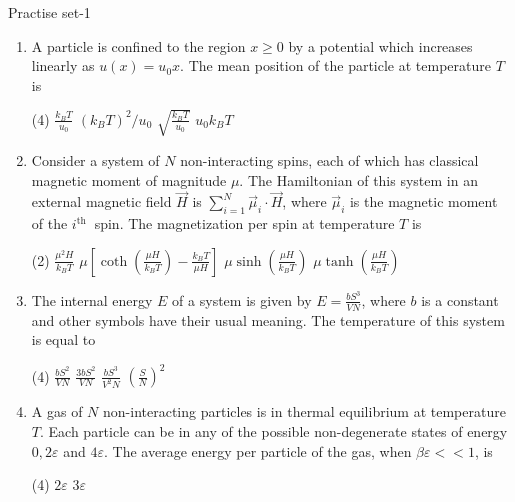 \newpage
\begin{abox}
	Practise set-1
\end{abox}
\begin{enumerate}
	\item A particle is confined to the region $x \geq 0$ by a potential which increases linearly as $u(x)=u_{0} x$. The mean position of the particle at temperature $T$ is
	{	}
	 \begin{tasks}(4)
		\task[\textbf{a.}] $\frac{k_{B} T}{u_{0}}$
		\task[\textbf{b.}]$\left(k_{B} T\right)^{2} / u_{0}$
		\task[\textbf{c.}]$\sqrt{\frac{k_{B} T}{u_{0}}}$
		\task[\textbf{d.}]  $u_{0} k_{B} T$
	\end{tasks}
\item 	Consider a system of $N$ non-interacting spins, each of which has classical magnetic moment of magnitude $\mu$. The Hamiltonian of this system in an external magnetic field $\vec{H}$ is $\sum_{i=1}^{N} \vec{\mu}_{i} \cdot \vec{H}$, where $\vec{\mu}_{i}$ is the magnetic moment of the $i^{\text {th }}$ spin. The magnetization per spin at temperature $T$ is
{	}
	 \begin{tasks}(2)
		\task[\textbf{a.}]$\frac{\mu^{2} H}{k_{B} T}$
		\task[\textbf{b.}]$\mu\left[\operatorname{coth}\left(\frac{\mu H}{k_{B} T}\right)-\frac{k_{B} T}{\mu H}\right]$
		\task[\textbf{c.}] $\mu \sinh \left(\frac{\mu H}{k_{B} T}\right)$
		\task[\textbf{d.}] $\mu \tanh \left(\frac{\mu H}{k_{B} T}\right)$
	\end{tasks}
\item 	The internal energy $E$ of a system is given by $E=\frac{b S^{3}}{V N}$, where $b$ is a constant and other symbols have their usual meaning. The temperature of this system is equal to
{	}
	 \begin{tasks}(4)
		\task[\textbf{a.}]$\frac{b S^{2}}{V N}$
		\task[\textbf{b.}]$\frac{3 b S^{2}}{V N}$
		\task[\textbf{c.}]$\frac{b S^{3}}{V^{2} N}$
		\task[\textbf{d.}] $\left(\frac{S}{N}\right)^{2}$
	\end{tasks}
\item A gas of $N$ non-interacting particles is in thermal equilibrium at temperature $T$. Each particle can be in any of the possible non-degenerate states of energy $0,2 \varepsilon$ and $4 \varepsilon$. The average energy per particle of the gas, when $\beta \varepsilon<<1$, is
{	}
 \begin{tasks}(4)
	\task[\textbf{a.}]$2 \varepsilon$
	\task[\textbf{b.}] $3 \varepsilon$

\end{tasks}
\end{enumerate}
